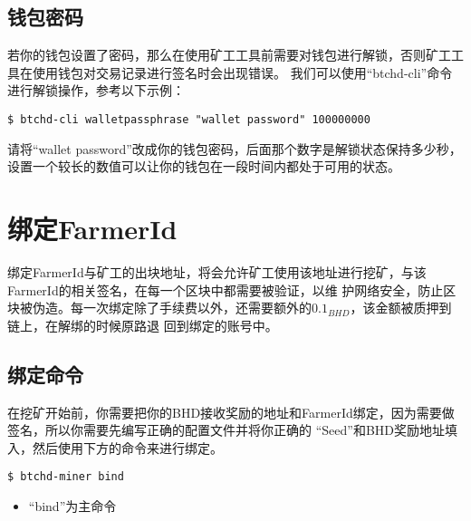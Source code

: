 \subsection{钱包密码}
\begin{flushleft}
    若你的钱包设置了密码，那么在使用矿工工具前需要对钱包进行解锁，否则矿工工具在使用钱包对交易记录进行签名时会出现错误。
    我们可以使用``btchd-cli''命令进行解锁操作，参考以下示例：
\end{flushleft}
\scriptsize
\begin{verbatim}
$ btchd-cli walletpassphrase "wallet password" 100000000
\end{verbatim}
\normalsize
\begin{flushleft}
    请将``wallet password''改成你的钱包密码，后面那个数字是解锁状态保持多少秒，
    设置一个较长的数值可以让你的钱包在一段时间内都处于可用的状态。
\end{flushleft}
\section{绑定FarmerId}
\begin{flushleft}
    绑定FarmerId与矿工的出块地址，将会允许矿工使用该地址进行挖矿，与该FarmerId的相关签名，在每一个区块中都需要被验证，以维
    护网络安全，防止区块被伪造。每一次绑定除了手续费以外，还需要额外的$0.1_{BHD}$，该金额被质押到链上，在解绑的时候原路退
    回到绑定的账号中。
\end{flushleft}
\subsection{绑定命令}
\begin{flushleft}
    在挖矿开始前，你需要把你的BHD接收奖励的地址和FarmerId绑定，因为需要做签名，所以你需要先编写正确的配置文件并将你正确的
    ``Seed''和BHD奖励地址填入，然后使用下方的命令来进行绑定。
\end{flushleft}
\scriptsize
\begin{verbatim}
$ btchd-miner bind
\end{verbatim}
\normalsize
\begin{itemize}
    \item ``bind''为主命令
\end{itemize}
